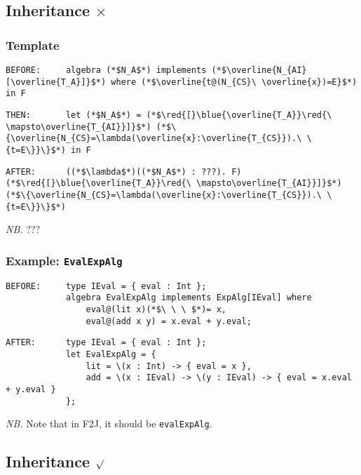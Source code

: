 \documentclass{article}
\newcommand{\red}[1]{\textcolor{red}{#1}}
\newcommand{\blue}[1]{\textcolor{blue}{#1}}
\newcommand{\nb}{\textit{NB. }}
\begin{document}
\begin{spacing}{1.1}
\subsection{Inheritance $\times$}

\subsubsection{Template}

\begin{lstlisting}[numbers=none]
BEFORE:     algebra (*$N_A$*) implements (*$\overline{N_{AI}[\overline{T_A}]}$*) where (*$\overline{t@(N_{CS}\ \overline{x})=E}$*) in F
\end{lstlisting}
\begin{lstlisting}[numbers=none]
THEN:       let (*$N_A$*) = (*$\red{[}\blue{\overline{T_A}}\red{\ \mapsto\overline{T_{AI}}]}$*) (*$\{\overline{N_{CS}=\lambda(\overline{x}:\overline{T_{CS}}).\ \{t=E\}}\}$*) in F
\end{lstlisting}
\begin{lstlisting}[numbers=none]
AFTER:      ((*$\lambda$*)((*$N_A$*) : ???). F) (*$\red{[}\blue{\overline{T_A}}\red{\ \mapsto\overline{T_{AI}}]}$*) (*$\{\overline{N_{CS}=\lambda(\overline{x}:\overline{T_{CS}}).\ \{t=E\}}\}$*)
\end{lstlisting}

\nb ???

\subsubsection{Example: \lstinline{EvalExpAlg}}

\begin{lstlisting}[numbers=none]
BEFORE:     type IEval = { eval : Int };
            algebra EvalExpAlg implements ExpAlg[IEval] where
                eval@(lit x)(*$\ \ \ $*)= x,
                eval@(add x y) = x.eval + y.eval;
\end{lstlisting}
\begin{lstlisting}[numbers=none]
AFTER:      type IEval = { eval : Int };
            let EvalExpAlg = {
                lit = \(x : Int) -> { eval = x },
                add = \(x : IEval) -> \(y : IEval) -> { eval = x.eval + y.eval }
            };
\end{lstlisting}

\nb Note that in F2J, it should be \lstinline{evalExpAlg}.

\subsection{Inheritance $\surd$}


\end{spacing}
\end{document}
